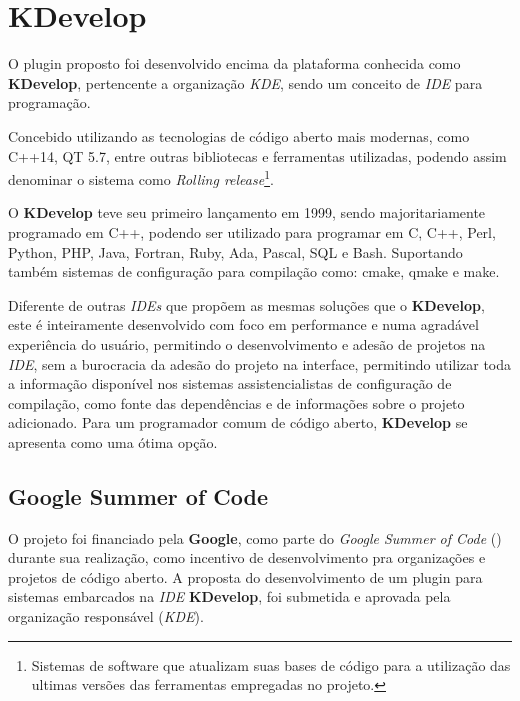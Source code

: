 
\section{KDevelop}
O plugin proposto foi desenvolvido encima da plataforma conhecida como \textbf{KDevelop}, pertencente a organização \textit{KDE},
sendo um conceito de \textit{IDE} para programação.

Concebido utilizando as tecnologias de código aberto mais modernas, como C++14, QT 5.7, entre outras bibliotecas e ferramentas
utilizadas, podendo assim denominar o sistema como \textit{Rolling release}\footnote{Sistemas de software que atualizam suas bases
de código para a utilização das ultimas versões das ferramentas empregadas no projeto.}.

O \textbf{KDevelop} teve seu primeiro lançamento em 1999, sendo majoritariamente programado em C++, podendo ser utilizado
para programar em C, C++, Perl, Python, PHP, Java, Fortran, Ruby, Ada, Pascal, SQL e Bash. Suportando também sistemas de
configuração para compilação como: cmake, qmake e make.

Diferente de outras \textit{IDEs} que propõem as mesmas soluções que o \textbf{KDevelop}, este é inteiramente desenvolvido
com foco em performance e numa agradável experiência do usuário, permitindo o desenvolvimento e adesão de projetos na \textit{IDE},
sem a burocracia da adesão do projeto na interface, permitindo utilizar toda a informação disponível nos sistemas assistencialistas
de configuração de compilação, como fonte das dependências e de informações sobre o projeto adicionado. Para um programador comum
de código aberto, \textbf{KDevelop} se apresenta como uma ótima opção.


\subsection{Google Summer of Code}
O projeto foi financiado pela \textbf{Google}, como parte do \textit{Google Summer of Code} () durante
sua realização, como incentivo de desenvolvimento pra organizações e projetos de código aberto. A proposta do desenvolvimento
de um plugin para sistemas embarcados na \textit{IDE} \textbf{KDevelop}, foi submetida e aprovada pela organização
responsável (\textit{KDE}).

